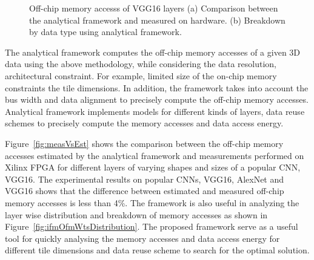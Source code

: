 \documentclass[a4paper,10pt]{article}
\begin{document}
\begin{figure}[!htb]
	\centering
	\hfil
	\hfil   
	\caption{Off-chip memory accesss of VGG16 layers (a) Comparison between the analytical framework and measured on hardware. (b) Breakdown by data type using analytical framework.}
	\label{fig:nnLayerData}
\end{figure}
The analytical framework computes the off-chip memory accesses of a given 3D data using the above methodology, while considering the data resolution, architectural constraint. For example, limited size of the on-chip memory constraints the tile dimensions.  In addition, the framework takes into account the bus width and data alignment to precisely compute the off-chip memory accesses. Analytical framework implements models for different kinds of layers, data reuse schemes to precisely compute the memory accesses and data access energy. 

Figure~\ref{fig:measVsEst} shows the comparison between the off-chip memory accesses estimated by the analytical framework and measurements performed on Xilinx FPGA for different layers of varying shapes and sizes of a popular CNN, VGG16. The experimental results on popular CNNs, VGG16, AlexNet and VGG16 shows that the difference between estimated and measured off-chip memory accesses is less than 4\%. The framework is also useful in analyzing the layer wise distribution and breakdown of memory accesses as shown in Figure~\ref{fig:ifmOfmWtsDistribution}. The proposed framework serve as a useful tool for quickly analysing the memory accesses and data access energy for different tile dimensions and data reuse scheme to search for the optimal solution. 
\end{document}
